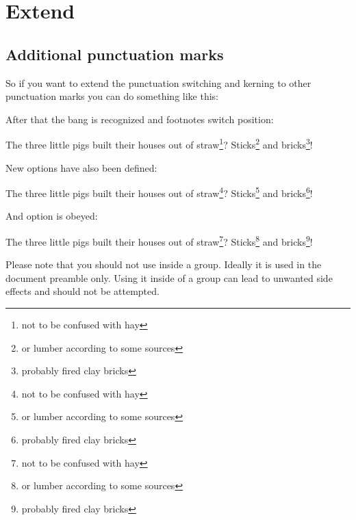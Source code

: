 \documentclass{fnpct-manual}
\begin{document}
\section{Extend \fnpct}
\subsection{Additional punctuation marks}
So if you want to extend the punctuation switching and kerning to other punctuation
marks you can do something like this:
\begin{sourcecode}
\end{sourcecode}
After that the bang is recognized and footnotes switch position:
\begin{example}
  The three little pigs built their houses out of straw\footnote{not to be
    confused with hay}? Sticks\footnote{or lumber according to some sources}
  and bricks\footnote{probably fired clay bricks}!
\end{example}

New options have also been defined:
\begin{example}
  The three little pigs built their houses out of straw\footnote{not to be
    confused with hay}? Sticks\footnote{or lumber according to some sources}
  and bricks\footnote{probably fired clay bricks}!
\end{example}

And option  is obeyed:
\begin{example}
  The three little pigs built their houses out of straw\footnote{not to be
    confused with hay}? Sticks\footnote{or lumber according to some sources}
  and bricks\footnote{probably fired clay bricks}!
\end{example}

\begin{bewareofthedog}
  Please note that you should not use  inside a
  group. Ideally it is used in the document preamble only.  Using it inside of
  a group can lead to unwanted side effects and should not be attempted.
\end{bewareofthedog}

\end{document}
